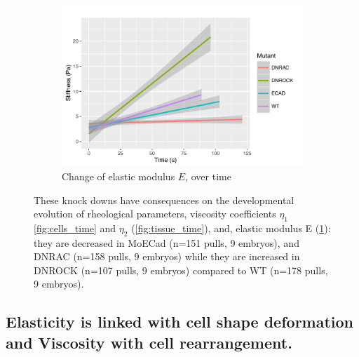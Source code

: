 \begin{figure}\ContinuedFloat

         \begin{subfigure}[t]{1\linewidth}
           \centering
           \includegraphics{Chapters/tweezers/Figs/PDF/Stiffness_-_Time}
           \caption{Change of elastic modulus $E$, over time}
           \label{fig:stiffness_time}
       \end{subfigure}\hfill
       \caption{These knock downs have consequences on the developmental evolution of rheological parameters, viscosity coefficients $\eta_1$ \ref{fig:cells_time} and $\eta_2$ (\ref{fig:tissue_time}), and, elastic modulus E (\ref{fig:stiffness_time}): they are decreased in MoECad (n=151 pulls, 9 embryos), and DNRAC (n=158 pulls, 9 embryos) while they are increased in DNROCK (n=107 pulls, 9 embryos) compared to WT (n=178 pulls, 9 embryos).
       \label{fig:visco_time}
       }
\end{figure}

\subsection{Elasticity is linked with cell shape deformation and Viscosity with cell rearrangement.}


